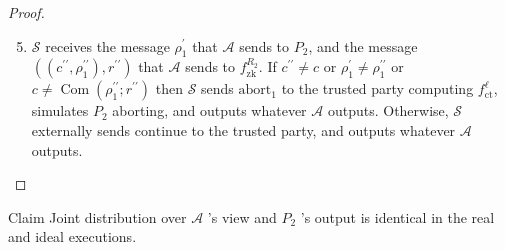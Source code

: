 \documentclass{beamer}
\begin{document}
    \begin{frame}
        \frametitle{}
    
        \begin{proof}
            \begin{enumerate}
                \setcounter{enumi}{4}
                \item $\mathcal{S}$ receives the message $\rho_{1}^{\prime}$ that $\mathcal{A}$ sends to $P_{2}$, and the message $\left(\left(c^{\prime \prime}, \rho_{1}^{\prime \prime}\right), r^{\prime \prime}\right)$ that $\mathcal{A}$ sends to $f_{\mathrm{zk}}^{R_{2}} .$ If $c^{\prime \prime} \neq c$ or $\rho_{1}^{\prime} \neq \rho_{1}^{\prime \prime}$ or $c \neq \operatorname{Com}\left(\rho_{1}^{\prime \prime} ; r^{\prime \prime}\right)$ then $\mathcal{S}$ sends $\mathrm{abort}_{1}$ to the trusted party computing $f_{\mathrm{ct}}^{\ell}$, simulates $P_{2}$ aborting, and outputs whatever $\mathcal{A}$ outputs. Otherwise, $\mathcal{S}$ externally sends $\mathrm{continue}$ to the trusted party, and outputs whatever $\mathcal{A}$ outputs.
            \end{enumerate}
        \end{proof}
        \begin{block}{Claim}
            Joint distribution over $\mathcal{A}$ 's view and $P_{2}$ 's output is identical in the real and ideal executions. 
        \end{block}
    
    \end{frame}
\end{document}
